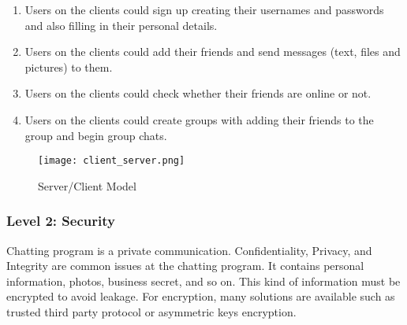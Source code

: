 \documentclass[a4paper,11pt]{article}
\begin{document}
\begin{itemize}
\begin{enumerate}
\item Users on the clients could sign up creating their usernames and passwords and also filling in their personal details.
\item Users on the clients could add their friends and send messages (text, files and pictures) to them.
\item Users on the clients could check whether their friends are online or not.
\item  Users on the clients could create groups with adding their friends to the group and begin group chats.

\end{enumerate}
\end{itemize}
\begin{figure}[h]
\centering
\texttt{[image: client\_server.png]}
\caption{\label{fig:UML2}Server/Client Model}
\end{figure}





\subsubsection{Level 2: Security}

Chatting program is a private communication. Confidentiality, Privacy, and Integrity are common issues at the chatting program. It contains personal information, photos, business secret, and so on. This kind of information must be encrypted to avoid leakage. For encryption, many solutions are available such as trusted third party protocol or asymmetric keys encryption.
\end{document}
